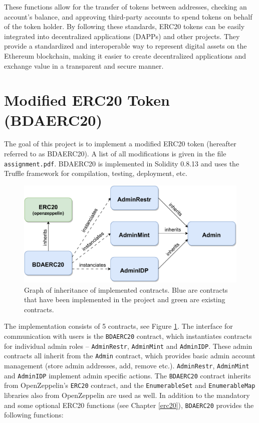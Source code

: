 \documentclass[12pt]{article}
\begin{document}
These functions allow for the transfer of tokens between addresses, checking an account's balance, and approving third-party accounts to spend tokens on behalf of the token holder. By following these standards, ERC20 tokens can be easily integrated into decentralized applications (DAPPs) and other projects. They provide a standardized and interoperable way to represent digital assets on the Ethereum blockchain, making it easier to create decentralized applications and exchange value in a transparent and secure manner.

\section{Modified ERC20 Token (BDAERC20)}
\label{next}
The goal of this project is to implement a modified ERC20 token (hereafter referred to as BDAERC20). A list of all modifications is given in the file \texttt{assignment.pdf}. BDAERC20 is implemented in Solidity 0.8.13 and uses the Truffle framework for compilation, testing, deployment, etc.

\begin{figure}[h]\centering
  \centering
  \includegraphics[width=0.8\linewidth]{images/contracts.pdf}
  \caption{Graph of inheritance of implemented contracts. Blue are contracts that have been implemented in the project and green are existing contracts.}
  \label{contracts}
\end{figure}

The implementation consists of 5 contracts, see Figure \ref{contracts}. The interface for communication with users is the \texttt{BDAERC20} contract, which instantiates contracts for individual admin roles -- \texttt{AdminRestr}, \texttt{AdminMint} and \texttt{AdminIDP}. These admin contracts all inherit from the \texttt{Admin} contract, which provides basic admin account management (store admin addresses, add, remove etc.). \texttt{AdminRestr}, \texttt{AdminMint} and \texttt{AdminIDP} implement admin specific actions. The \texttt{BDAERC20} contract inherits from OpenZeppelin's \texttt{ERC20} \cite{oz-doc} contract, and the \texttt{EnumerableSet} and \texttt{EnumerableMap} libraries also from OpenZeppelin are used as well. In addition to the mandatory and some optional ERC20 functions (see Chapter \ref{erc20}), \texttt{BDAERC20} provides the following functions:
\end{document}
